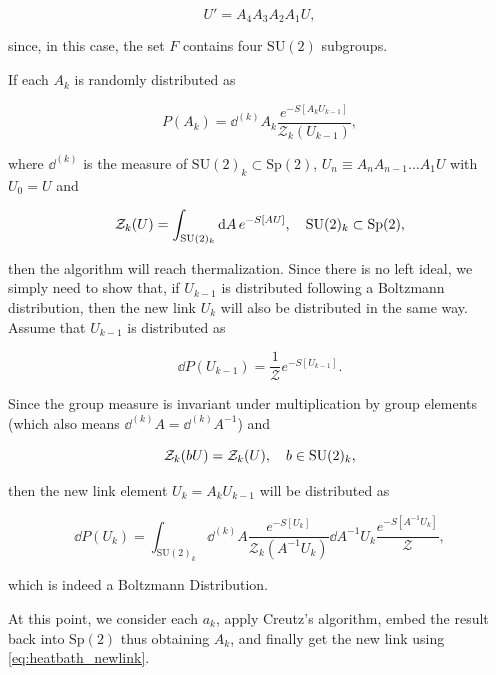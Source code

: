 \documentclass[reqno,12pt]{article}
\numberwithin{equation}{section}
\newcommand{\Z}{\mathcal{Z}}
\newcommand{\SU}{\mathrm{SU}}
\newcommand{\Sp}{\mathrm{Sp}}
\begin{document}
\begin{equation} \label{eq:heatbath_newlink}
	U' = A_4 A_3 A_2 A_1 U,
\end{equation}

since, in this case, the set $F$ contains four $\SU(2)$ subgroups.

If each $A_k$ is randomly distributed as

\begin{equation} \label{eq:probdist}
	P(A_k) = \dd^{(k)}{A_k} \frac{e^{-S[A_k U_{k-1}]}}{\mathcal{Z}_k(U_{k-1})},
\end{equation}

where $\dd^{(k)}$ is the measure of $\SU(2)_k \subset \Sp(2)$, $U_{n} \equiv A_n A_{n-1} \dots A_1 U$ with $U_0 = U$ and 

\begin{equation}
	\mathcal{Z}_k(U) = \int_{\SU(2)_k} \dd{A} e^{-S[AU]} \qc \SU(2)_k \subset \Sp(2),
\end{equation}

then the algorithm will reach thermalization. Since there is no left ideal, we simply need to show that, if $U_{k-1}$
is distributed following a Boltzmann distribution, then the new link $U_k$ will also be distributed in the same way.
Assume that $U_{k-1}$ is distributed as

\begin{equation}
	\dd{P(U_{k-1})} = \frac{1}{\Z} e^{-S[U_{k-1}]}.
\end{equation}

Since the group measure is invariant under multiplication by group elements (which also means 
$\dd^{(k)}{A} = \dd^{(k)}{A^{-1}}$) and

\begin{equation}
	\Z_k(b U) = \Z_k(U) \qc b \in \SU(2)_k,
\end{equation}

then the new link element $U_k = A_k U_{k-1}$ will be distributed as

\begin{equation}
	\dd{P(U_k)} = \int_{\SU(2)_k} \dd^{(k)}{A} \frac{e^{-S[U_k]}}{\Z_k(A^{-1}U_k)} \dd{A^{-1}U_k} \frac{e^{-S[A^{-1}U_k]}}{\Z},
\end{equation}

which is indeed a Boltzmann Distribution. 

At this point, we consider each $a_k$, apply Creutz's algorithm, embed the result back into $\Sp(2)$ thus obtaining
$A_k$, and finally get the new link using \eqref{eq:heatbath_newlink}.
\end{document}
